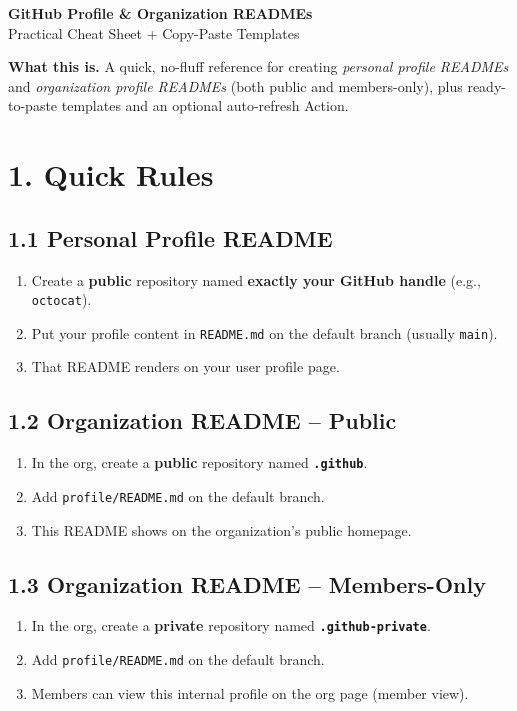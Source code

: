 \documentclass[11pt]{article}
\renewcommand{\kbd}[1]{\texttt{#1}}
\begin{document}
\begin{center}
  {\LARGE \textbf{GitHub Profile \& Organization READMEs}}\\[4pt]
  {\large Practical Cheat Sheet + Copy-Paste Templates}
\end{center}

\vspace{0.5em}

\begin{tcolorbox}
\textbf{What this is.} A quick, no-fluff reference for creating \emph{personal profile READMEs} and \emph{organization profile READMEs} (both public and members-only), plus ready-to-paste templates and an optional auto-refresh Action.
\end{tcolorbox}

\section*{1. Quick Rules}

\subsection*{1.1 Personal Profile README}
\begin{enumerate}
  \item Create a \textbf{public} repository named \textbf{exactly your GitHub handle} (e.g., \kbd{octocat}).
  \item Put your profile content in \kbd{README.md} on the default branch (usually \kbd{main}).
  \item That README renders on your user profile page.
\end{enumerate}

\subsection*{1.2 Organization README -- Public}
\begin{enumerate}
  \item In the org, create a \textbf{public} repository named \textbf{\kbd{.github}}.
  \item Add \kbd{profile/README.md} on the default branch.
  \item This README shows on the organization's public homepage.
\end{enumerate}

\subsection*{1.3 Organization README -- Members-Only}
\begin{enumerate}
  \item In the org, create a \textbf{private} repository named \textbf{\kbd{.github-private}}.
  \item Add \kbd{profile/README.md} on the default branch.
  \item Members can view this internal profile on the org page (member view).
\end{enumerate}
\end{document}
